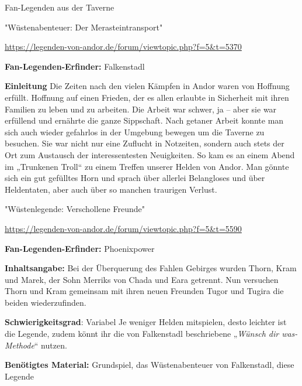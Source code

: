 {\begin{center}
    Fan-Legenden aus der Taverne
\end{center}




\begin{center}
    "Wüstenabenteuer: Der Merasteintransport"

    \url{https://legenden-von-andor.de/forum/viewtopic.php?f=5&t=5370}
\end{center}

\textbf{Fan-Legenden-Erfinder:} Falkenstadl

\textbf{Einleitung}
Die Zeiten nach den vielen Kämpfen in Andor waren von Hoffnung erfüllt. Hoffnung auf einen Frieden, der es allen erlaubte in Sicherheit mit ihren Familien zu leben und zu arbeiten. Die Arbeit war schwer, ja – aber sie war erfüllend und ernährte die ganze Sippschaft.
Nach getaner Arbeit konnte man sich auch wieder gefahrlos in der Umgebung bewegen um die Taverne zu besuchen. Sie war nicht nur eine Zuflucht in Notzeiten, sondern auch stets der Ort zum Austausch der interessentesten Neuigkeiten. So kam es an einem Abend im „Trunkenen Troll“ zu einem Treffen unserer Helden von Andor. Man gönnte sich ein gut gefülltes Horn und sprach über allerlei Belangloses und über Heldentaten, aber auch über so manchen traurigen Verlust.




\begin{center}
    "Wüstenlegende: Verschollene Freunde"

    \url{https://legenden-von-andor.de/forum/viewtopic.php?f=5&t=5590}
\end{center}

\textbf{Fan-Legenden-Erfinder:} Phoenixpower


\textbf{Inhaltsangabe:} Bei der Überquerung des Fahlen Gebirges wurden Thorn, Kram und Marek, der Sohn Merriks von Chada und Eara getrennt. Nun versuchen Thorn und Kram gemeinsam mit ihren neuen Freunden Tugor und Tugira die beiden wiederzufinden.

\textbf{Schwierigkeitsgrad}: Variabel
Je weniger Helden mitspielen, desto leichter ist die Legende, zudem könnt ihr die von Falkenstadl beschriebene „\textit{Wünsch dir was-Methode}“ nutzen.

\textbf{Benötigtes Material:} Grundspiel, das Wüstenabenteuer von Falkenstadl, diese Legende





}
